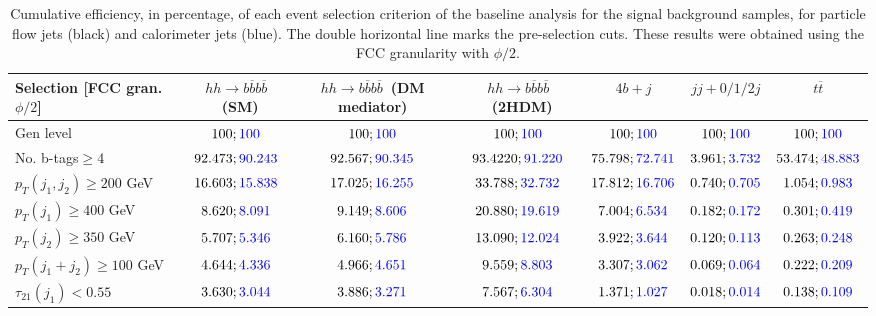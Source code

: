 \begin{landscape}
		\begin{table}
			\centering
			\caption{Cumulative efficiency, in percentage, of each event selection criterion of the baseline analysis for the signal background samples, for particle flow jets (black) and calorimeter jets (blue). The double horizontal line marks the pre-selection cuts. These results were obtained using the FCC granularity with $\phi/2$.}
			\begin{tabular}{lcccccc}
				\toprule 
				\textbf{Selection [FCC gran. $\phi/2$]} & $hh\rightarrow b\overline{b}b\overline{b}$~(SM) & $hh\rightarrow b\overline{b}b\overline{b}$~(DM mediator) & $hh\rightarrow b\overline{b}b\overline{b}$~(2HDM) & $4b+j$  & $jj+0/1/2 j$ & $t\overline{t}$ \\
				\midrule
				Gen level & $100;\textcolor{blue}{100}$ & $100;\textcolor{blue}{100}$ &$100;\textcolor{blue}{100}$& $100;\textcolor{blue}{100}$& $100;\textcolor{blue}{100}$& $100;\textcolor{blue}{100}$ \\
				\rowcolor{black!7}No. b-tags$\geq 4$&$92.473;\textcolor{blue}{90.243}$&$92.567;\textcolor{blue}{90.345}$&$93.4220;\textcolor{blue}{91.220}$&$75.798;\textcolor{blue}{72.741}$&$3.961;\textcolor{blue}{3.732}$&$53.474;\textcolor{blue}{48.883}$\\
				$p_T(j_1,j_2)\geq200$ GeV & $16.603;\textcolor{blue}{15.838}$ & $17.025;\textcolor{blue}{16.255}$&$33.788;\textcolor{blue}{32.732}$ &$17.812;\textcolor{blue}{16.706}$&$0.740;\textcolor{blue}{0.705}$&$1.054;\textcolor{blue}{0.983}$\\
				\midrule \midrule
				\rowcolor{black!7}$p_T(j_1)\geq 400$ GeV & $8.620;\textcolor{blue}{8.091}$ &$9.149;\textcolor{blue}{8.606}$  &$20.880;\textcolor{blue}{19.619}$&$7.004;\textcolor{blue}{6.534}$&$0.182;\textcolor{blue}{0.172}$&$0.301;\textcolor{blue}{0.419}$\\ 
				$p_T(j_2)\geq 350$ GeV & $5.707;\textcolor{blue}{5.346}$& $6.160;\textcolor{blue}{5.786}$&$13.090;\textcolor{blue}{12.024}$&$3.922;\textcolor{blue}{3.644}$&$0.120;\textcolor{blue}{0.113}$&$0.263;\textcolor{blue}{0.248}$\\
				\rowcolor{black!7}$p_T(j_1+j_2)\geq 100$ GeV &$4.644;\textcolor{blue}{4.336}$ & $4.966;\textcolor{blue}{4.651}$ &$9.559;\textcolor{blue}{8.803}$&$3.307;\textcolor{blue}{3.062}$&$0.069;\textcolor{blue}{0.064}$&$0.222;\textcolor{blue}{0.209}$\\
				$\tau_{21}(j_1)<0.55$ & $3.630;\textcolor{blue}{3.044}$& $3.886;\textcolor{blue}{3.271}$&$7.567;\textcolor{blue}{6.304}$&$1.371;\textcolor{blue}{1.027}$&$0.018;\textcolor{blue}{0.014}$&$0.138;\textcolor{blue}{0.109}$\\

\end{tabular}
\end{table}
\end{landscape}
